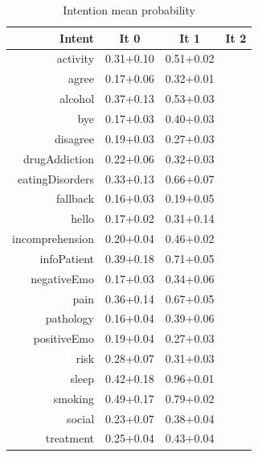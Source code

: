 \documentclass[11pt]{article}
\begin{document}
{\begin{table}[htb]
\begin{center}
\begin{tabular}{ |r|c|c|c| }
\hline
Intent & It 0 & It 1 & It 2 \\ \hline
activity		& 0.31+0.10 & 0.51+0.02	\\ \hline
agree 			& 0.17+0.06 & 0.32+0.01	\\ \hline
alcohol 		& 0.37+0.13 & 0.53+0.03	\\ \hline
bye 			& 0.17+0.03 & 0.40+0.03	\\ \hline
disagree 		& 0.19+0.03 & 0.27+0.03	\\ \hline
drugAddiction 	& 0.22+0.06 & 0.32+0.03 \\ \hline
eatingDisorders & 0.33+0.13 & 0.66+0.07 \\ \hline
fallback 		& 0.16+0.03 & 0.19+0.05	\\ \hline
hello 			& 0.17+0.02 & 0.31+0.14	\\ \hline
incomprehension & 0.20+0.04 & 0.46+0.02	\\ \hline
infoPatient 	& 0.39+0.18 & 0.71+0.05 \\ \hline
negativeEmo 	& 0.17+0.03 & 0.34+0.06 \\ \hline
pain 			& 0.36+0.14 & 0.67+0.05 \\ \hline
pathology 		& 0.16+0.04 & 0.39+0.06 \\ \hline
positiveEmo 	& 0.19+0.04 & 0.27+0.03 \\ \hline
risk 			& 0.28+0.07 & 0.31+0.03 \\ \hline
sleep 			& 0.42+0.18 & 0.96+0.01 \\ \hline
smoking 		& 0.49+0.17 & 0.79+0.02 \\ \hline
social 			& 0.23+0.07 & 0.38+0.04 \\ \hline
treatment 		& 0.25+0.04 & 0.43+0.04 \\ \hline
\end{tabular}
\caption{Intention mean probability}
\end{center}
\end{table}
\FloatBarrier

}
\end{document}

